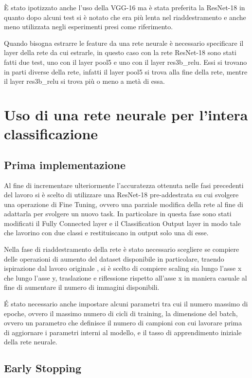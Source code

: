 È stato ipotizzato anche l'uso della VGG-16 ma è stata preferita la ResNet-18 in quanto dopo alcuni test si è notato che era più lenta nel riaddestramento e anche meno utilizzata negli esperimenti presi come riferimento.

Quando bisogna estrarre le feature da una rete neurale è necessario specificare il layer della rete da cui estrarle, in questo caso con la rete ResNet-18 sono stati fatti due test, uno con il layer pool5 e uno con il layer res3b\_relu. Essi si trovano in parti diverse della rete, infatti il layer pool5 si trova alla fine della rete, mentre il layer res3b\_relu si trova più o meno a metà di essa.


\section{Uso di una rete neurale per l'intera classificazione}

\subsection{Prima implementazione}
Al fine di incrementare ulteriormente l'accuratezza ottenuta nelle fasi precedenti del lavoro si è scelto di utilizzare una ResNet-18 pre-addestrata su cui svolgere una operazione di Fine Tuning, ovvero una parziale modifica della rete al fine di adattarla per svolgere un nuovo task. In particolare in questa fase sono stati modificati il Fully Connected layer e il Classification Output layer in modo tale che lavorino con due classi e restituiscano in output solo una di esse. 

Nella fase di riaddestramento della rete è stato necessario scegliere se compiere delle operazioni di aumento del dataset disponibile in particolare, traendo ispirazione dal lavoro originale \cite{sheng2021learning}, si è scelto di compiere scaling sia lungo l'asse x che lungo l'asse y, traslazione e riflessione rispetto all'asse x in maniera casuale al fine di aumentare il numero di immagini disponibili. 

É stato necessario anche impostare alcuni parametri tra cui il numero massimo di epoche, ovvero il massimo numero di cicli di training, la dimensione del batch, ovvero un parametro che definisce il numero di campioni con cui lavorare prima di aggiornare i parametri interni al modello, e il tasso di apprendimento iniziale della rete neurale.


\subsection{Early Stopping}

